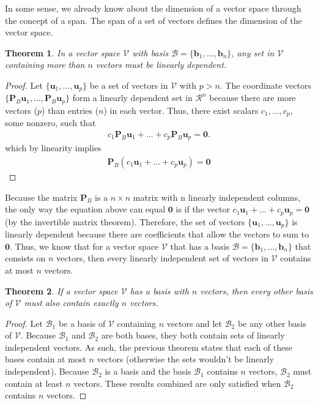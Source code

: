 \documentclass[
]{book}
\newtheorem{theorem}{Theorem}[chapter]
\theoremstyle{definition}
\theoremstyle{definition}
\theoremstyle{definition}
\theoremstyle{definition}
\theoremstyle{remark}
\begin{document}
In some sense, we already know about the dimension of a vector space through the concept of a span. The span of a set of vectors defines the dimension of the vector space.

\begin{theorem}
In a vector space \(\mathcal{V}\) with basis \(\mathcal{B} = \{ \mathbf{b}_1, \ldots, \mathbf{b}_n\}\), any set in \(\mathcal{V}\) containing more than \(n\) vectors must be linearly dependent.
\end{theorem}

\begin{proof}
Let \(\{\mathbf{u}_1, \ldots, \mathbf{u}_p \}\) be a set of vectors in \(\mathcal{V}\) with \(p > n\). The coordinate vectors \(\{\mathbf{P}_B \mathbf{u}_1, \ldots, \mathbf{P}_B \mathbf{u}_p\}\) form a linearly dependent set in \(\mathcal{R}^n\) because there are more vectors (\(p\)) than entries (\(n\)) in each vector. Thus, there exist scalars \(c_1, \ldots, c_p\), some nonzero, such that
\[
\begin{aligned}
c_1 \mathbf{P}_B \mathbf{u}_1 + \ldots + c_p \mathbf{P}_B \mathbf{u}_p = \mathbf{0}.
\end{aligned}
\]
which by linearity implies
\[
\begin{aligned}
\mathbf{P}_B (c_1 \mathbf{u}_1 + \ldots + c_p \mathbf{u}_p) = \mathbf{0} 
\end{aligned}
\]
\end{proof}

Because the matrix \(\mathbf{P}_{B}\) is a \(n \times n\) matrix with n linearly independent columns, the only way the equation above can equal \(\mathbf{0}\) is if the vector \(c_1 \mathbf{u}_1 + \ldots + c_p \mathbf{u}_p = \mathbf{0}\) (by the invertible matrix theorem). Therefore, the set of vectors \(\{\mathbf{u}_1, \ldots, \mathbf{u}_p \}\) is linearly dependent because there are coefficients that allow the vectors to sum to \(\mathbf{0}\). Thus, we know that for a vector space \(\mathcal{V}\) that has a basis \({\mathcal{B} = \{ \mathbf{b}_1, \ldots, \mathbf{b}_n \}}\) that consists on \(n\) vectors, then every linearly independent set of vectors in \(\mathcal{V}\) contains at most \(n\) vectors.

\begin{theorem}
If a vector space \({\mathcal{V}}\) has a basis with \(n\) vectors, then every other basis of \({\mathcal{V}}\) must also contain exactly \(n\) vectors.
\end{theorem}

\begin{proof}
Let \(\mathcal{B}_1\) be a basis of \({\mathcal{V}}\) containing \(n\) vectors and let \(\mathcal{B}_2\) be any other basis of \({\mathcal{V}}\). Because \(\mathcal{B}_1\) and \(\mathcal{B}_2\) are both bases, they both contain sets of linearly independent vectors. As such, the previous theorem states that each of these bases contain at most \(n\) vectors (otherwise the sets wouldn't be linearly independent). Because \(\mathcal{B}_2\) is a basis and the basis \(\mathcal{B}_1\) contains \(n\) vectors, \(\mathcal{B}_2\) must contain at least \(n\) vectors. These results combined are only satisfied when \(\mathcal{B}_2\) contains \(n\) vectors.
\end{proof}
\end{document}
